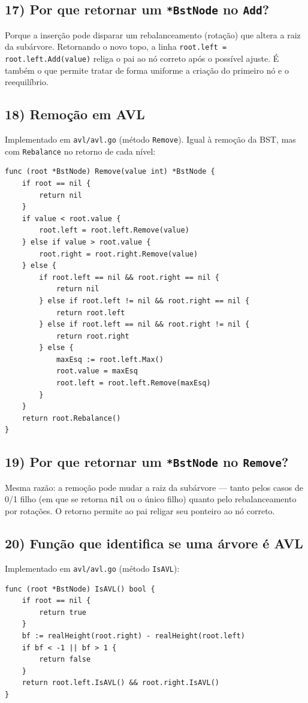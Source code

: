 \documentclass[11pt,a4paper]{article}
\begin{document}
\subsection*{17) Por que retornar um \texttt{*BstNode} no \texttt{Add}?}
Porque a inserção pode disparar um rebalanceamento (rotação) que altera a raiz da subárvore.
Retornando o novo topo, a linha \texttt{root.left = root.left.Add(value)} religa o pai ao nó
correto após o possível ajuste. É também o que permite tratar de forma uniforme a criação do
primeiro nó e o reequilíbrio.

\subsection*{18) Remoção em AVL}
Implementado em \texttt{avl/avl.go} (método \texttt{Remove}). Igual à remoção da BST, mas com
\texttt{Rebalance} no retorno de cada nível:
\begin{lstlisting}
func (root *BstNode) Remove(value int) *BstNode {
    if root == nil {
        return nil
    }
    if value < root.value {
        root.left = root.left.Remove(value)
    } else if value > root.value {
        root.right = root.right.Remove(value)
    } else {
        if root.left == nil && root.right == nil {
            return nil
        } else if root.left != nil && root.right == nil {
            return root.left
        } else if root.left == nil && root.right != nil {
            return root.right
        } else {
            maxEsq := root.left.Max()
            root.value = maxEsq
            root.left = root.left.Remove(maxEsq)
        }
    }
    return root.Rebalance()
}
\end{lstlisting}

\subsection*{19) Por que retornar um \texttt{*BstNode} no \texttt{Remove}?}
Mesma razão: a remoção pode mudar a raiz da subárvore --- tanto pelos casos de 0/1 filho
(em que se retorna \texttt{nil} ou o único filho) quanto pelo rebalanceamento por rotações.
O retorno permite ao pai religar seu ponteiro ao nó correto.

\subsection*{20) Função que identifica se uma árvore é AVL}
Implementado em \texttt{avl/avl.go} (método \texttt{IsAVL}):
\begin{lstlisting}
func (root *BstNode) IsAVL() bool {
    if root == nil {
        return true
    }
    bf := realHeight(root.right) - realHeight(root.left)
    if bf < -1 || bf > 1 {
        return false
    }
    return root.left.IsAVL() && root.right.IsAVL()
}
\end{lstlisting}
\end{document}
